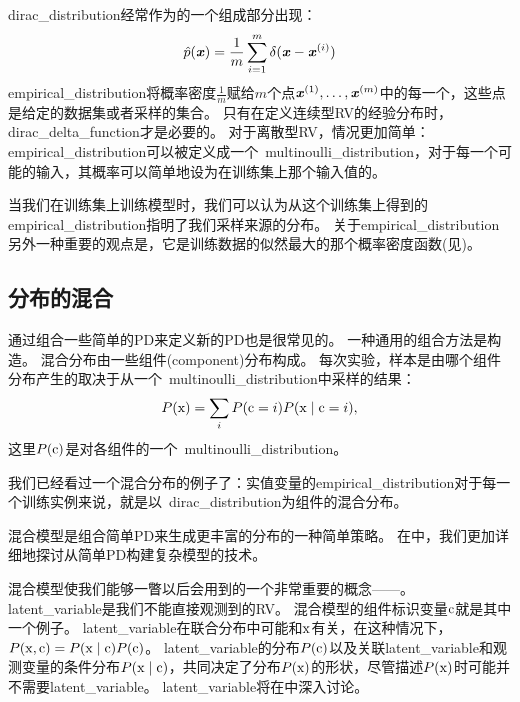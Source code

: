 \gls{dirac_distribution}经常作为的一个组成部分出现：
\begin{equation}
\hat{p}(\boldsymbol{\mathit{x}}) = \frac{1}{m} \sum_{i=1}^m \delta(\boldsymbol{\mathit{x}} - \boldsymbol{\mathit{x}}^{(i)})
\end{equation}
\gls{empirical_distribution}将概率密度$\frac{1}{m}$赋给$m$个点$\boldsymbol{\mathit{x}}^{(1)}, \ldots, \boldsymbol{\mathit{x}}^{(m)}$中的每一个，这些点是给定的数据集或者采样的集合。
只有在定义连续型\gls{RV}的经验分布时，\gls{dirac_delta_function}才是必要的。
对于离散型\gls{RV}，情况更加简单：\gls{empirical_distribution}可以被定义成一个~\gls{multinoulli_distribution}，对于每一个可能的输入，其概率可以简单地设为在训练集上那个输入值的。

当我们在训练集上训练模型时，我们可以认为从这个训练集上得到的\gls{empirical_distribution}指明了我们采样来源的分布。
关于\gls{empirical_distribution}另外一种重要的观点是，它是训练数据的似然最大的那个概率密度函数(见)。

\subsection{分布的混合}
\label{sec:mixtures_of_distributions}

通过组合一些简单的\gls{PD}来定义新的\gls{PD}也是很常见的。
一种通用的组合方法是构造。
混合分布由一些组件(component)分布构成。
每次实验，样本是由哪个组件分布产生的取决于从一个~\gls{multinoulli_distribution}中采样的结果：
\begin{equation}
P(\mathrm{x}) = \sum_i P(\mathrm{c} = i) P(\mathrm{x} \mid \mathrm{c} = i),
\end{equation}
这里$P(\mathrm{c})$是对各组件的一个~\gls{multinoulli_distribution}。

我们已经看过一个混合分布的例子了：实值变量的\gls{empirical_distribution}对于每一个训练实例来说，就是以~\gls{dirac_distribution}为组件的混合分布。


混合模型是组合简单\gls{PD}来生成更丰富的分布的一种简单策略。
在中，我们更加详细地探讨从简单\gls{PD}构建复杂模型的技术。

混合模型使我们能够一瞥以后会用到的一个非常重要的概念——。
\gls{latent_variable}是我们不能直接观测到的\gls{RV}。
混合模型的组件标识变量$\mathrm{c}$就是其中一个例子。
\gls{latent_variable}在联合分布中可能和$\mathrm{x}$有关，在这种情况下，$P(\mathrm{x}, \mathrm{c}) = P(\mathrm{x} \mid \mathrm{c})P(\mathrm{c})$。
\gls{latent_variable}的分布$P(\mathrm{c})$以及关联\gls{latent_variable}和观测变量的条件分布$P(\mathrm{x} \mid\mathrm{c})$，共同决定了分布$P(\mathrm{x})$的形状，尽管描述$P(\mathrm{x})$时可能并不需要\gls{latent_variable}。
\gls{latent_variable}将在中深入讨论。

